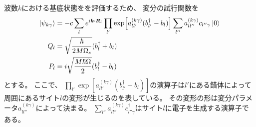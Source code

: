\documentclass[11pt,dvipdfmx,a4paper]{jsarticle}
\begin{document}
波数\(k\)における基底状態をを評価するため、
変分の試行関数を
\begin{equation}
    \begin{split}
        \ket{\psi_{k\gamma}}
            &=- c\sum_l e^{i\vb*{k}\cdot\vb*{R}_l}
            \prod_{l'}\exp[a_{ll'}^{(k\gamma)}(b_{l'}^{\dagger}-b_{l})]
            \sum_{l''} a_{ll''}^{(k\gamma)}c_{l''\gamma}\ket{0}\\
        Q_l &= \sqrt{\frac{\hbar}{2M\Omega_s}}(b_l^{\dagger}+b_l)\\
        P_l &= i\sqrt{\frac{M\hbar\Omega}{2}}(b_l^{\dagger}-b_l)
    \end{split}
\end{equation}
とする。
ここで、
\(\prod_{l'}\exp[a_{ll'}^{(k\gamma)}(b_{l'}^\dagger-b_l)]\)の演算子は\(l'\)にある錯体によって
周囲にあるサイト\(l\)の変形が生じるのを表している。
その変形の形は変分パラメータ\(a_{ll''}^{(k\gamma)}\)によって決まる。
\(\sum_{l''}a_{ll''}^{(k\gamma)}c_{l''\gamma}^{\dagger}\)はサイト\(l\)に電子を生成する演算子である。






\end{document}
